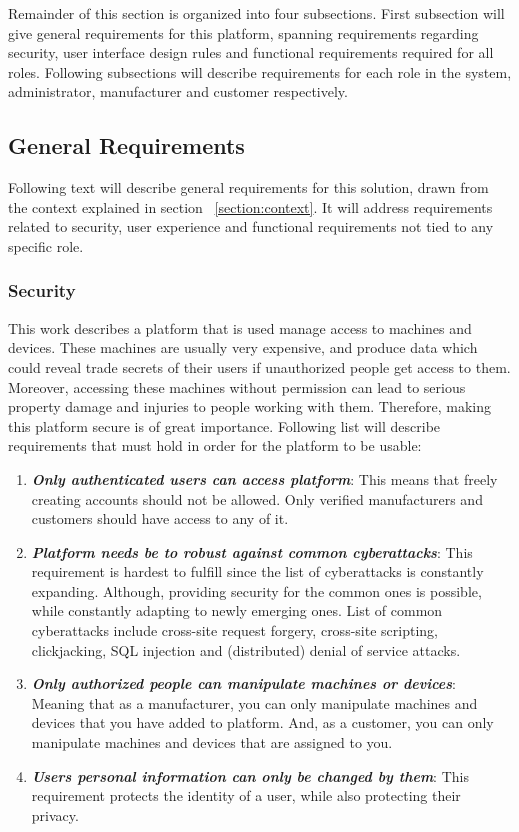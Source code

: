 Remainder of this section is organized into four subsections. First subsection will give general requirements for this platform, spanning requirements regarding security, user interface design rules and functional requirements required for all roles. Following subsections will describe requirements for each role in the system, administrator, manufacturer and customer respectively.    

\subsection{General Requirements}

Following text will describe general requirements for this solution, drawn from the context explained in section ~\ref{section:context}. It will address requirements related to security, user experience and functional requirements not tied to any specific role.

\subsubsection{Security}
\label{subsubsection:security}

This work describes a platform that is used manage access to machines and devices. These machines are usually very expensive, and produce data which could reveal trade secrets of their users if unauthorized people get access to them. Moreover, accessing these machines without permission can lead to serious property damage and injuries to people working with them. Therefore, making this platform secure is of great importance. Following list will describe requirements that must hold in order for the platform to be usable:

\begin{enumerate}
	\setlength{\itemsep}{1pt}
	\item \textbf{\textit{Only authenticated users can access platform}}: This means that freely creating accounts should not be allowed. Only verified manufacturers and customers should have access to any of it.

	\item \textbf{\textit{Platform needs be to robust against common cyberattacks}}: This requirement is hardest to fulfill since the list of cyberattacks is constantly expanding. Although, providing security for the common ones is possible, while constantly adapting to newly emerging ones. List of common cyberattacks include cross-site request forgery, cross-site scripting, clickjacking, SQL injection and (distributed) denial of service attacks.

	\item \textbf{\textit{Only authorized people can manipulate machines or devices}}: Meaning that as a manufacturer, you can only manipulate machines and devices that you have added to platform. And, as a customer, you can only manipulate machines and devices that are assigned to you.

	\item \textbf{\textit{Users personal information can only be changed by them}}: This requirement protects the identity of a user, while also protecting their privacy. 
\end{enumerate}

